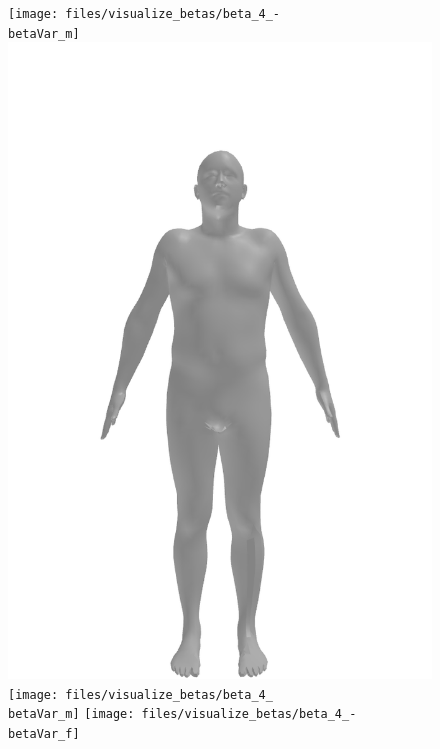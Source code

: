 \begin{figure}[ht!]
    \centering

    \begin{minipage}[b]{\textwidth}
        \centering
        \texttt{[image: files/visualize\_betas/beta\_4\_-\\betaVar\_m]}
        \includegraphics[width=\imgWidth]{files/visualize_betas/baseline_m}
        \texttt{[image: files/visualize\_betas/beta\_4\_\\betaVar\_m]}
        \linebreak
        \texttt{[image: files/visualize\_betas/beta\_4\_-\\betaVar\_f]}

\end{minipage}
\end{figure}

